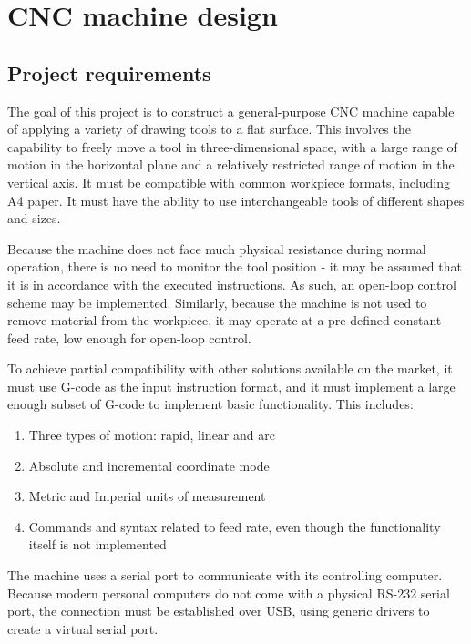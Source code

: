 \clearpage
\section{CNC machine design}

\subsection{Project requirements}

The goal of this project is to construct a general-purpose CNC machine capable
of applying a variety of drawing tools to a flat surface. This involves
the capability to freely move a tool in three-dimensional space, with a large
range of motion in the horizontal plane and a relatively restricted range of
motion in the vertical axis. It must be compatible with common workpiece
formats, including A4 paper. It must have the ability to use interchangeable
tools of different shapes and sizes.

Because the machine does not face much physical resistance during normal
operation, there is no need to monitor the tool position - it may be assumed
that it is in accordance with the executed instructions. As such, an open-loop
control scheme may be implemented. Similarly, because the machine is not used
to remove material from the workpiece, it may operate at a pre-defined constant
feed rate, low enough for open-loop control.

To achieve partial compatibility with other solutions available on the market,
it must use G-code as the input instruction format, and it must implement a
large enough subset of G-code to implement basic functionality. This includes:
\begin{enumerate}
    \item Three types of motion: rapid, linear and arc
    \item Absolute and incremental coordinate mode
    \item Metric and Imperial units of measurement
    \item Commands and syntax related to feed rate, even though the
    functionality itself is not implemented
\end{enumerate}

The machine uses a serial port to communicate with its controlling computer.
Because modern personal computers do not come with a physical RS-232 serial
port, the connection must be established over USB, using generic drivers to
create a virtual serial port.

